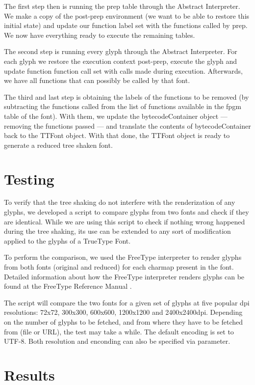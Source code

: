\documentclass[12pt]{article}
\begin{document}
The first step then is running the prep table through the Abstract 
Interpreter. We make a copy of the post-prep environment (we want to be
able to restore this initial state) and update our function label
set with the functions called by prep. We now have everything ready to
execute the remaining tables.

The second step is running every glyph through the Abstract Interpreter.
For each glyph we restore the execution context post-prep, execute the
glyph and update function function call set with calls made during
execution. Afterwards, we have all functions that can possibly be called
by that font.

The third and last step is obtaining the labels of the functions
to be removed (by subtracting the functions called from the list of
functions available in the fpgm table of the font). With them, we update
the bytecodeContainer object --- removing the functions passed --- and
translate the contents of bytecodeContainer back to the TTFont object. 
With that done, the TTFont object is ready to generate a reduced
tree shaken font.

\section{Testing}

To verify that the tree shaking do not interfere with the
renderization of any glyphs, we developed a script to compare glyphs
from two fonts and check if they are identical. While we are using this
script to check if nothing wrong happened during the tree shaking, its
use can be extended to any sort of modification applied to the glyphs of
a TrueType Font.

To perform the comparison, we used the FreeType interpreter to render
glyphs from both fonts (original and reduced) for each charmap present
in the font. Detailed information about how the FreeType interpreter
renders glyphs can be found at the FreeType Reference Manual
\cite{freetypemanual}. 

The script will compare the two fonts for a given set of glyphs at
five popular dpi resolutions: 72x72, 300x300, 600x600, 1200x1200 and
2400x2400dpi. Depending on the number of glyphs to be fetched, and from
where they have to be fetched from (file or URL), the test may take a
while. The default encoding is set to UTF-8. Both resolution and
enconding can also be specified via parameter.

\section{Results}
\end{document}
